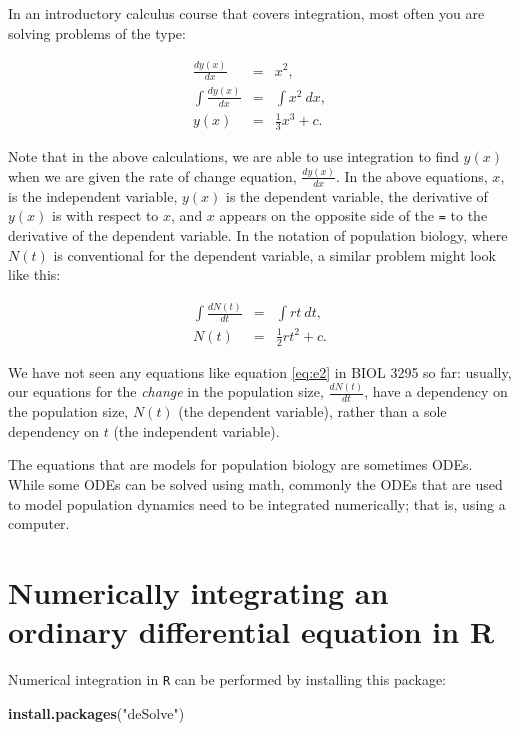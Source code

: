 \documentclass[]{book}
\newenvironment{Shaded}{\begin{snugshade}}{\end{snugshade}}
\newcommand{\KeywordTok}[1]{\textcolor[rgb]{0.13,0.29,0.53}{\textbf{{#1}}}}
\newcommand{\StringTok}[1]{\textcolor[rgb]{0.31,0.60,0.02}{{#1}}}
\newcommand{\NormalTok}[1]{{#1}}
\begin{document}
In an introductory calculus course that covers integration, most often
you are solving problems of the type:

\begin{eqnarray}
\frac{dy(x)}{dx} &=& x^2, \\
\int \frac{dy(x)}{dx} &=& \int x^2 \ dx, \\
y(x) &=& \frac{1}{3}x^3 + c.
\label{eq:e1}
\end{eqnarray}

Note that in the above calculations, we are able to use integration to
find \(y(x)\) when we are given the rate of change equation,
\(\frac{dy(x)}{dx}\). In the above equations, \(x\), is the independent
variable, \(y(x)\) is the dependent variable, the derivative of \(y(x)\)
is with respect to \(x\), and \(x\) appears on the opposite side of the
\texttt{=} to the derivative of the dependent variable. In the notation
of population biology, where \(N(t)\) is conventional for the dependent
variable, a similar problem might look like this:

\begin{eqnarray}
\int \frac{dN(t)}{dt} &=& \int rt \ dt, \\ \nonumber
N(t) &=& \frac{1}{2}rt^2 + c. 
\label{eq:e2}
\end{eqnarray}

We have not seen any equations like equation \eqref{eq:e2} in BIOL 3295 so
far: usually, our equations for the \emph{change} in the population
size, \(\frac{dN(t)}{dt}\), have a dependency on the population size,
\(N(t)\) (the dependent variable), rather than a sole dependency on
\(t\) (the independent variable).

The equations that are models for population biology are sometimes ODEs.
While some ODEs can be solved using math, commonly the ODEs that are
used to model population dynamics need to be integrated numerically;
that is, using a computer.

\section{Numerically integrating an ordinary differential equation in
R}\label{numerically-integrating-an-ordinary-differential-equation-in-r}

Numerical integration in \texttt{R} can be performed by installing this
package:

\begin{Shaded}
\begin{Highlighting}[]
\KeywordTok{install.packages}\NormalTok{(}\StringTok{"deSolve"}\NormalTok{)}
\end{Highlighting}
\end{Shaded}
\end{document}
